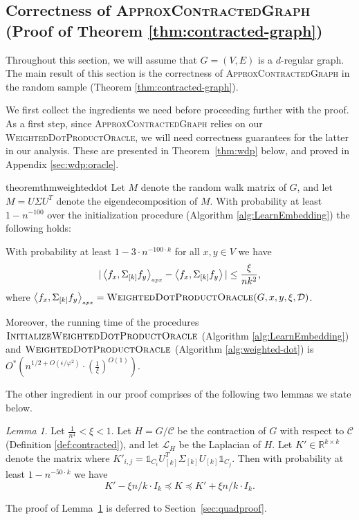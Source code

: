 \documentclass[letterpaper,11pt]{article}
\newcommand{\runningtimeiv}{ O^*\left(n^{1/2+O(\e/\varphi^2)}\cdot \left(\frac{1}{\xi}\right)^{O(1)}\right)}
\newcommand{\cC}{\mathcal{C}}
\newcommand{\R}{\mathbb{R}}
\theoremstyle{plain}
\theoremstyle{definition}
\theoremstyle{remark}
\newtheorem{lemmma}{Lemma}
\newcommand{\e}{\epsilon}
\newcommand{\adp}[1]
  {\ensuremath{\left\langle #1 \right\rangle_{\scriptscriptstyle apx}}}
\newcommand{\rdp}[1]
  {\ensuremath{\left\langle #1 \right\rangle}}
\newcommand{\mycolor}[1]{\textcolor{black}{#1}}
\begin{document}
\subsection{Correctness of \textsc{ApproxContractedGraph} (Proof of Theorem \ref{thm:contracted-graph})}  \label{sec:est:quad:forms}
Throughout this section, we will assume that $G=(V,E)$ is a $d$-regular graph. The main result of this section is the correctness of \textsc{ApproxContractedGraph} in the random sample (Theorem \ref{thm:contracted-graph}).

We first collect the ingredients we need before proceeding further with the proof. As a first step, since \textsc{ApproxContractedGraph} relies on our \textsc{WeightedDotProductOracle}, we will need correctness guarantees for the latter in our analysis. These are presented in Theorem~\ref{thm:wdp} below, and proved in Appendix \ref{sec:wdp:oracle}.

 

\begin{restatable}{theorem}{thmweighteddot}
\label{thm:wdp}
Let $M$ denote the random walk matrix of $G$, and  let $M=U\Sigma U^T $ denote the eigendecomposition of  $M$. 
With probability at least $1 - n^{-100}$ over the initialization procedure (Algorithm \ref{alg:LearnEmbedding}) the following holds:

With probability at least $1-3\cdot n^{-100\cdot k}$ for all $x,y\in V$ we have
\[|\adp{f_{x},\Sigma_{[k]} f_y} -\rdp{f_{x},\Sigma_{[k]} f_y}  | \leq \frac{\xi}{\mycolor{nk^2}
} \text{,}\]
where $\adp{f_{x},\Sigma_{[k]} f_y} = \textsc{WeightedDotProductOracle}(G,x,y,  \xi, \mathcal{D})$. 

Moreover, the running time of the procedures
$\textsc{InitializeWeightedDotProductOracle}$ (Algorithm \ref{alg:LearnEmbedding}) and $\textsc{WeightedDotProductOracle}$ 
(Algorithm \ref{alg:weighted-dot}) is $\runningtimeiv$.
\end{restatable}


The other ingredient in our proof comprises of the following two lemmas we state below. 

\begin{lemmma} \label{lem:kk'-close}
    Let $\frac{1}{n^4}<\xi<1$. Let $H=G/\cC$  be the contraction of $G$ with respect to $\cC$ (Definition \ref{def:contracted}), and let $\mathcal{L}_H$ be the Laplacian of $H$. Let $K' \in \R^{k \times k}$ denote the matrix where $K'_{i,j} = \mathds{1}_{C_i} U_{[k]}^T \Sigma_{[k]} U_{[k]} \mathds{1}_{C_j}$. Then with 
	probability at least $1 - n^{-50\cdot k}$ we have
 $$K' - \xi n/k \cdot I_k \preceq K \preceq K' + \xi n/k \cdot I_k.$$
\end{lemmma}
The proof of Lemma~\ref{lem:kk'-close} is deferred to Section~\ref{sec:quadproof}. 
\end{document}
